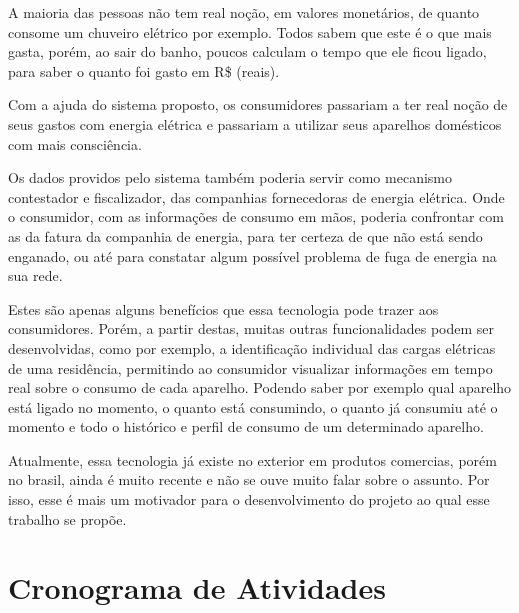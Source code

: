 A maioria das pessoas não tem real noção, em valores monetários, de quanto consome um chuveiro elétrico por exemplo. Todos sabem que este é o que mais gasta, porém, ao sair do banho, poucos calculam o tempo que ele ficou ligado, para saber o quanto foi gasto em R\$ (reais).

Com a ajuda do sistema proposto, os consumidores passariam a ter real noção de seus gastos com energia elétrica e passariam a utilizar seus aparelhos domésticos com mais consciência.

Os dados providos pelo sistema também poderia servir como mecanismo contestador e fiscalizador, das companhias fornecedoras de energia elétrica. Onde o consumidor, com as informações de consumo em mãos, poderia confrontar com as da fatura da companhia de energia, para ter certeza de que não está sendo enganado, ou até para constatar algum possível problema de fuga de energia na sua rede.

Estes são apenas alguns benefícios que essa tecnologia pode trazer aos consumidores. Porém, a partir destas, muitas outras funcionalidades podem ser desenvolvidas, como por exemplo, a identificação individual das cargas elétricas de uma residência, permitindo ao consumidor visualizar informações em tempo real sobre o consumo de cada aparelho. Podendo saber por exemplo qual aparelho está ligado no momento, o quanto está consumindo, o quanto já consumiu até o momento e todo o histórico e perfil de consumo de um determinado aparelho.

Atualmente, essa tecnologia já existe no exterior em produtos comercias, porém no brasil, ainda é muito recente e não se ouve muito falar sobre o assunto. Por isso, esse é mais um motivador para o desenvolvimento do projeto ao qual esse trabalho se propõe.

\section{Cronograma de Atividades}

